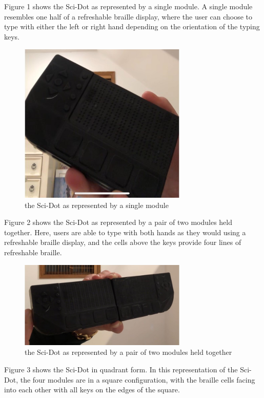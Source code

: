 \documentclass[11.5pt]{sig-alternate}
\begin{document}
\begin{large}
\\\\Figure 1 shows the Sci-Dot as represented by a single module. A single module resembles one half of a refreshable braille display, where the user can choose to type with either the left or right hand depending on the orientation of the typing keys.
\pagebreak
\begin{figure}[htp]
    \centering
    \includegraphics[width=8cm]{figure 1.png}
 \caption{the Sci-Dot as represented by a single module }
    \label{the Sci-Dot as represented by a single module}
\end{figure}

Figure 2 shows the Sci-Dot as represented by a pair of two modules held together. Here, users are able to type with both hands as they would using a refreshable braille display, and the cells above the keys provide four lines of refreshable braille.
\begin{figure}[htp]
    \centering
    \includegraphics[width=8cm]{figure 2.png}
 \caption{the Sci-Dot as represented by a pair of two modules held together }
    \label{the Sci-Dot as represented by a pair of two modules held together}
\end{figure}

Figure 3 shows the Sci-Dot in quadrant form. In this representation of the Sci-Dot, the four modules are in a square configuration, with the braille cells facing into each other with all keys on the edges of the square. 


\end{large}
\end{document}
